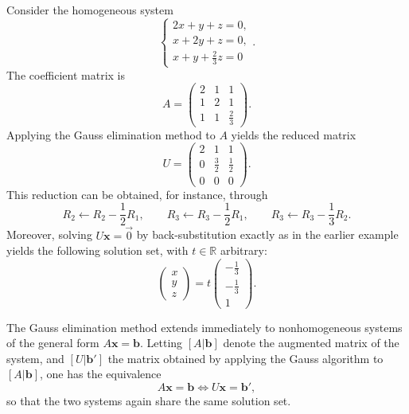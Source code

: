 \begin{example}
Consider the homogeneous system
\[
\begin{cases}
2x + y + z = 0, \\
x + 2y + z = 0, \\
x + y + \tfrac{2}{3} z = 0
\end{cases}.
\]
The coefficient matrix is
\[
A = \begin{pmatrix} 2 & 1 & 1 \\ 1 & 2 & 1 \\ 1 & 1 & \tfrac{2}{3} \end{pmatrix}.
\]
Applying the Gauss elimination method to $A$ yields the reduced matrix
\[
U = \begin{pmatrix} 2 & 1 & 1 \\ 0 & \tfrac{3}{2} & \tfrac{1}{2} \\ 0 & 0 & 0 \end{pmatrix}.
\]
This reduction can be obtained, for instance, through
\[
R_2\leftarrow R_2-\frac12R_1,\qquad
R_3\leftarrow R_3-\frac12R_1,\qquad
R_3\leftarrow R_3-\frac13R_2.
\]
Moreover, solving $U\mathbf{x} = \vec{0}$ by back-substitution exactly as in the earlier example yields the following solution set, with $t \in \mathbb{R}$ arbitrary:
\[
\begin{pmatrix} x \\ y \\ z \end{pmatrix} = t \begin{pmatrix} -\tfrac{1}{3} \\ -\tfrac{1}{3} \\ 1 \end{pmatrix}.
\]

\end{example}

The Gauss elimination method extends immediately to nonhomogeneous systems of the general form $A\mathbf{x} = \mathbf{b}$. Letting $[A | \mathbf{b}]$ denote the augmented matrix of the system, and $[U | \mathbf{b}']$ the matrix obtained by applying the Gauss algorithm to $[A | \mathbf{b}]$, one has the equivalence
\[
A\mathbf{x} = \mathbf{b} \iff U\mathbf{x} = \mathbf{b}',
\]
so that the two systems again share the same solution set.

